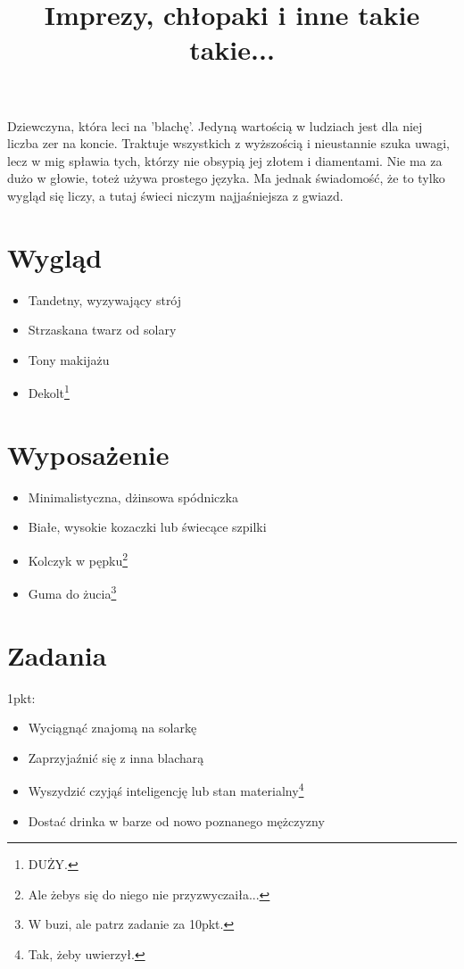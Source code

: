 \documentclass[11pt,a4paper,sans]{moderncv}        %
\title{Imprezy, chłopaki i inne takie takie...}                               %
\begin{document}
\makecvtitle
Dziewczyna, która leci na 'blachę'. Jedyną wartością w ludziach jest dla niej liczba zer na koncie. Traktuje wszystkich
z wyższością i nieustannie szuka uwagi, lecz w mig spławia tych, którzy nie obsypią jej złotem i diamentami. Nie ma za
dużo w głowie, toteż używa prostego języka. Ma jednak świadomość, że to tylko wygląd się liczy, a tutaj świeci niczym
najjaśniejsza z gwiazd.

\section{Wygląd}
\begin{itemize}
	\item Tandetny, wyzywający strój
	\item Strzaskana twarz od solary
	\item Tony makijażu
	\item Dekolt\footnote{DUŻY.}
\end{itemize}

\section{Wyposażenie}
\begin{itemize}
	\item Minimalistyczna, dżinsowa spódniczka
	\item Białe, wysokie kozaczki lub świecące szpilki
	\item Kolczyk w pępku\footnote{Ale żebys się do niego nie przyzwyczaiła...}
	\item Guma do żucia\footnote{W buzi, ale patrz zadanie za 10pkt.}
\end{itemize}


\section{Zadania}
1pkt:
\begin{itemize}
	\item Wyciągnąć znajomą na solarkę
	\item Zaprzyjaźnić się z inna blacharą
	\item Wyszydzić czyjąś inteligencję lub stan materialny\footnote{Tak, żeby uwierzył.}
	\item Dostać drinka w barze od nowo poznanego mężczyzny 
\end{itemize}
\newpage
\end{document}
